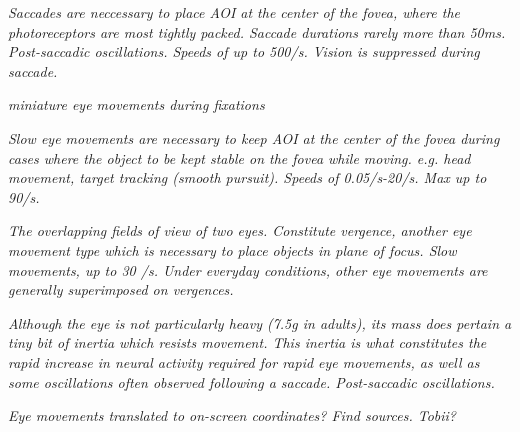 \textit{Saccades are neccessary to place AOI at the center of the fovea, where the photoreceptors are most tightly packed. Saccade durations rarely more than 50ms. Post-saccadic oscillations. Speeds of up to 500\degree/s. Vision is suppressed during saccade.}

\textit{miniature eye movements during fixations}

\textit{Slow eye movements are necessary to keep AOI at the center of the fovea during cases where the object to be kept stable on the fovea while moving. e.g. head movement, target tracking (smooth pursuit). Speeds of 0.05\degree/s-20\degree/s. Max up to 90\degree/s.}

\textit{The overlapping fields of view of two eyes. Constitute vergence, another eye movement type which is necessary to place objects in plane of focus. Slow movements, up to 30 \degree/s. Under everyday conditions, other eye movements are generally superimposed on vergences.}

\textit{Although the eye is not particularly heavy (7.5g in adults), its mass does pertain a tiny bit of inertia which resists movement. This inertia is what constitutes the rapid increase in neural activity required for rapid eye movements, as well as some oscillations often observed following a saccade. Post-saccadic oscillations.}

\textit{Eye movements translated to on-screen coordinates? Find sources. Tobii?}








